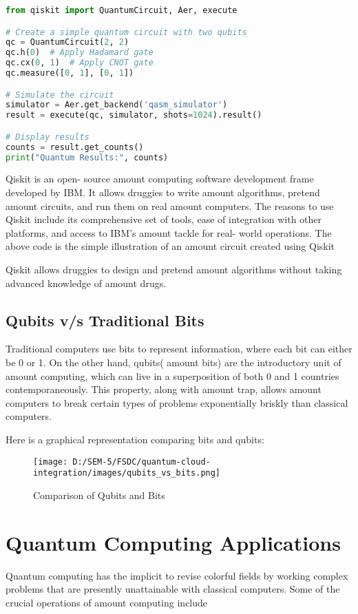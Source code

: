 \documentclass[conference]{IEEEtran}
\begin{document}
\begin{tcolorbox}[title=Qiskit Example]
\begin{lstlisting}[language=Python]
from qiskit import QuantumCircuit, Aer, execute

# Create a simple quantum circuit with two qubits
qc = QuantumCircuit(2, 2)
qc.h(0)  # Apply Hadamard gate
qc.cx(0, 1)  # Apply CNOT gate
qc.measure([0, 1], [0, 1])

# Simulate the circuit
simulator = Aer.get_backend('qasm_simulator')
result = execute(qc, simulator, shots=1024).result()

# Display results
counts = result.get_counts()
print("Quantum Results:", counts)
\end{lstlisting}
\end{tcolorbox}
Qiskit is an open- source amount computing software development  frame developed by IBM. It allows  druggies to write amount algorithms,  pretend amount circuits, and run them on real amount computers. The reasons to use Qiskit include its comprehensive set of tools, ease of integration with other platforms, and access to IBM's amount  tackle for real- world  operations. The above code is the simple  illustration of an amount circuit created using Qiskit

Qiskit allows druggies to design and pretend amount algorithms without taking advanced knowledge of amount drugs.

\subsection{Qubits v/s Traditional Bits}
 Traditional computers use bits to represent information, where each bit can either be 0 or 1. On the other hand, qubits( amount bits) are the  introductory unit of amount computing, which can  live in a superposition of both 0 and 1  countries  contemporaneously. This property, along with amount trap, allows amount computers to  break certain types of problems exponentially  briskly than classical computers. 


Here is a graphical representation comparing bits and qubits:

\begin{figure}[h!]
    \centering
    \texttt{[image: D:/SEM-5/FSDC/quantum-cloud-integration/images/qubits\_vs\_bits.png]}
    \caption{Comparison of Qubits and Bits}
    \label{fig:qubits_vs_bits}
\end{figure}


\begin{center}
    \fontsize{14}{16}\selectfont \bfseries
    \section{Quantum Computing Applications}
\end{center}
Quantum computing has the implicit to revise  colorful fields by  working complex problems that are  presently  unattainable 
 with classical computers. Some of the  crucial  operations of amount computing include 
\end{document}
